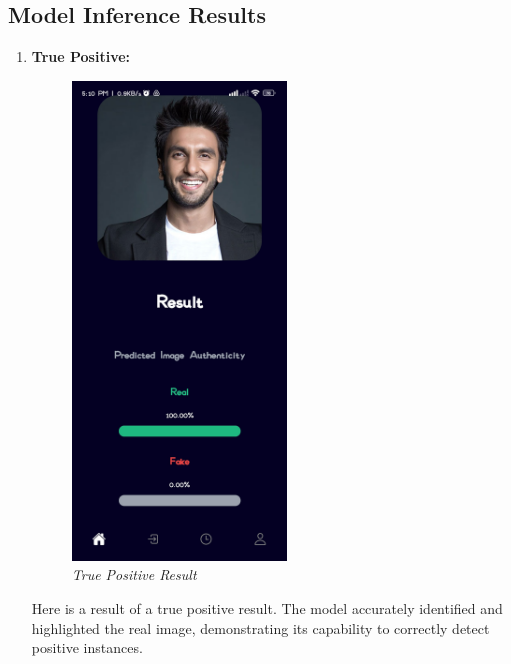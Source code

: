 \subsection{Model Inference Results }
\begin{enumerate}
    \item \textbf{True Positive:}
          \\

          \begin{figure}[ht]
              \centering
              \includegraphics[height =5in  ]{img/ranveerResult.jpg}
              \caption{\textit{True Positive Result}}
          \end{figure}

          Here is a result of a true positive result. The model accurately identified and highlighted the real image, demonstrating its capability to correctly detect positive instances.


\end{enumerate}
